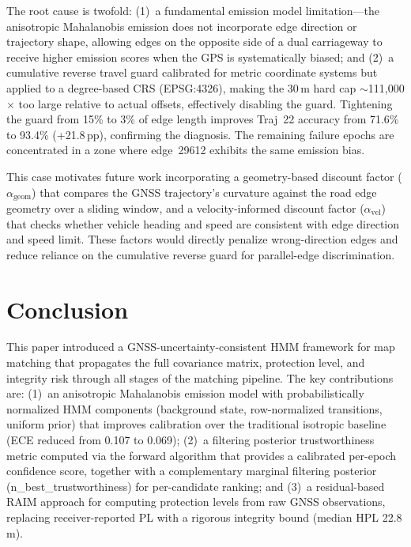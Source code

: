 \documentclass[letterpaper,journal]{IEEEtran}
\begin{document}
The root cause is twofold: (1)~a fundamental emission model limitation---the
anisotropic Mahalanobis emission does not incorporate edge direction or trajectory
shape, allowing edges on the opposite side of a dual carriageway to receive
higher emission scores when the GPS is systematically biased; and (2)~a
cumulative reverse travel guard calibrated for metric coordinate systems but
applied to a degree-based CRS (EPSG:4326), making the 30\,m hard cap
$\sim$111,000$\times$ too large relative to actual offsets, effectively disabling
the guard. Tightening the guard from 15\% to 3\% of edge length improves Traj~22
accuracy from 71.6\% to 93.4\% (+21.8\,pp), confirming the diagnosis. The
remaining failure epochs are concentrated in a zone where edge~29612 exhibits
the same emission bias.

This case motivates future work incorporating a geometry-based discount factor
($\alpha_{\text{geom}}$) that compares the GNSS trajectory's curvature against
the road edge geometry over a sliding window, and a velocity-informed discount
factor ($\alpha_{\text{vel}}$) that checks whether vehicle heading and speed are
consistent with edge direction and speed limit. These factors would directly
penalize wrong-direction edges and reduce reliance on the cumulative reverse
guard for parallel-edge discrimination.

\section{Conclusion}
This paper introduced a GNSS-uncertainty-consistent HMM framework
for map matching that propagates the full covariance matrix,
protection level, and integrity risk through all stages of the
matching pipeline. The key contributions are: (1)~an anisotropic
Mahalanobis emission model with probabilistically normalized HMM
components (background state, row-normalized transitions, uniform
prior) that improves calibration over the traditional isotropic
baseline (ECE reduced from 0.107 to 0.069); (2)~a filtering posterior
trustworthiness metric computed via the forward algorithm that provides
a calibrated per-epoch confidence score, together with a complementary
marginal filtering posterior (n\_best\_trustworthiness) for
per-candidate ranking; and (3)~a residual-based RAIM approach for
computing protection levels from raw GNSS observations, replacing
receiver-reported PL with a rigorous integrity bound (median HPL
22.8\,m).
\end{document}
